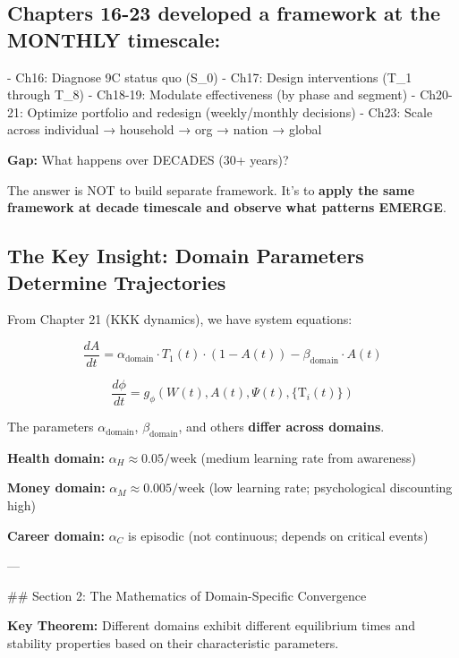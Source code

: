 \subsection{Chapters 16-23 developed a framework at the MONTHLY timescale:}

- Ch16: Diagnose 9C status quo (S_0)
- Ch17: Design interventions (T_1 through T_8)
- Ch18-19: Modulate effectiveness (by phase and segment)
- Ch20-21: Optimize portfolio and redesign (weekly/monthly decisions)
- Ch23: Scale across individual → household → org → nation → global

\textbf{Gap:} What happens over DECADES (30+ years)?

The answer is NOT to build separate framework. It's to \textbf{apply the same framework at decade timescale and observe what patterns EMERGE}.

\subsection{The Key Insight: Domain Parameters Determine Trajectories}

From Chapter 21 (KKK dynamics), we have system equations:

\begin{equation}
\frac{dA}{dt} = \alpha_{\text{domain}} \cdot T_1(t) \cdot (1 - A(t)) - \beta_{\text{domain}} \cdot A(t)
\end{equation}

\begin{equation}
\frac{d\phi}{dt} = g_\phi(W(t), A(t), \Psi(t), \{\text{T}_i(t)\})
\end{equation}

The parameters $\alpha_{\text{domain}}$, $\beta_{\text{domain}}$, and others \textbf{differ across domains}.

\textbf{Health domain:} $\alpha_H \approx 0.05/\text{week}$ (medium learning rate from awareness)

\textbf{Money domain:} $\alpha_M \approx 0.005/\text{week}$ (low learning rate; psychological discounting high)

\textbf{Career domain:} $\alpha_C$ is episodic (not continuous; depends on critical events)

---

## Section 2: The Mathematics of Domain-Specific Convergence

\textbf{Key Theorem:} Different domains exhibit different equilibrium times and stability properties based on their characteristic parameters.

